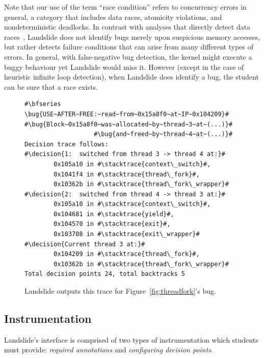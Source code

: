 Note that our use of the term ``race condition'' refers to concurrency errors in general, a category that includes data races, atomicity violations, and nondeterministic deadlocks.
In contrast with analyses that directly detect data races~\cite{tsan}, Landslide does not identify bugs merely upon suspicious memory accesses, but rather detects failure conditions that can arise from many different types of errors.
In general, with false-negative bug detection, the kernel might execute a buggy behaviour yet Landslide would miss it. However (except in the case of heuristic infinite loop detection), when Landslide does identify a bug, the student can be sure that a race exists.

\newcommand\bug[1]{\hilight{red}{#1}}
\newcommand\decision[1]{\bfseries \hilight{olivegreen}{#1}}
\newcommand\stacktrace[1]{\hilight{darkcyan}{#1}}
\begin{figure}[t]
\small
\begin{lstlisting}
#\bfseries \bug{USE~AFTER~FREE:~read~from~0x15a8f0~at~IP~0x104209}#
#\bug{Block~0x15a8f0~was~allocated~by~thread~3~at~(...)}#
                   #\bug{and~freed~by~thread~4~at~(...)}#
Decision trace follows:
#\decision{1:  switched from thread 3 -> thread 4 at:}#
        0x105a10 in #\stacktrace{context\_switch}#,
        0x1041f4 in #\stacktrace{thread\_fork}#,
        0x10362b in #\stacktrace{thread\_fork\_wrapper}#
#\decision{2:  switched from thread 4 -> thread 3 at:}#
        0x105a10 in #\stacktrace{context\_switch}#,
        0x104681 in #\stacktrace{yield}#,
        0x104570 in #\stacktrace{exit}#,
        0x103708 in #\stacktrace{exit\_wrapper}#
#\decision{Current thread 3 at:}#
        0x104209 in #\stacktrace{thread\_fork}#,
        0x10362b in #\stacktrace{thread\_fork\_wrapper}#
Total decision points 24, total backtracks 5
\end{lstlisting}
\caption{Landslide outputs this trace for Figure~\ref{fig:threadfork}'s bug.}
\label{fig:trace}
\end{figure}

\subsection{Instrumentation}
\label{sec:instrument}

Landslide's interface is comprised of two types of instrumentation which students must provide: {\em required annotations} and {\em configuring decision points}.

